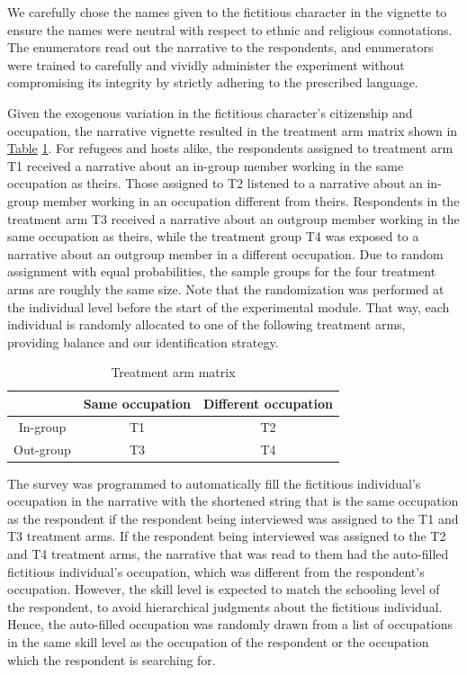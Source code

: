 \documentclass[a4paper,12pt]{article}
\begin{document}
\begin{appendix}
We carefully chose the names given to the fictitious character in the vignette to ensure the names were neutral with respect to ethnic and religious connotations. The enumerators read out the narrative to the respondents, and enumerators were trained to carefully and vividly administer the experiment without compromising its integrity by strictly adhering to the prescribed language. 

Given the exogenous variation in the fictitious character's citizenship and occupation, the narrative vignette resulted in the treatment arm matrix shown in \hyperref[tab:treatarm]{Table} \ref{tab:treatarm}. For refugees and hosts alike, the respondents assigned to treatment arm T1 received a narrative about an in-group member working in the same occupation as theirs. Those assigned to T2 listened to a narrative about an in-group member working in an occupation different from theirs. Respondents in the treatment arm T3 received a narrative about an outgroup member working in the same occupation as theirs, while the treatment group T4 was exposed to a narrative about an outgroup member in a different occupation. Due to random assignment with equal probabilities, the sample groups for the four treatment arms are roughly the same size.  Note that the randomization was performed at the individual level before the start of the experimental module. That way, each individual is randomly allocated to one of the following treatment arms, providing balance and our identification strategy. 

    \begin{table}[H]
        \begin{center}
        \caption{Treatment arm matrix}
        \label{tab:treatarm}
            \begin{tabular}{c|cc}
             & Same occupation & Different occupation \\
            \hline\hline
            In-group & T1 & T2 \\
            Out-group & T3 & T4 \\
            \end{tabular}
        \end{center}
    \end{table}

The survey was programmed to automatically fill the fictitious individual's occupation in the narrative with the shortened string that is the same occupation as the respondent if the respondent being interviewed was assigned to the T1 and T3 treatment arms. If the respondent being interviewed was assigned to the T2 and T4 treatment arms, the narrative that was read to them had the auto-filled fictitious individual's occupation, which was different from the respondent's occupation. However, the skill level is expected to match the schooling level of the respondent, to avoid hierarchical judgments about the fictitious individual. Hence, the auto-filled occupation was randomly drawn from a list of occupations in the same skill level as the occupation of the respondent or the occupation which the respondent is searching for. 
    

\end{appendix}
\end{document}
